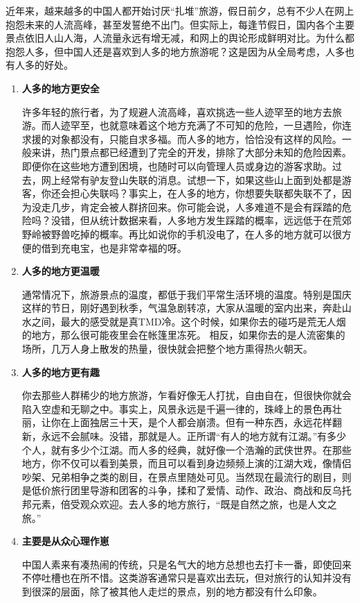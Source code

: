 近年来，越来越多的中国人都开始讨厌“扎堆”旅游，假日前夕，总有不少人在网上抱怨未来的人流高峰，甚至发誓绝不出门。但实际上，每逢节假日，国内各个主要景点依旧人山人海，人流量永远有增无减，和网上的舆论形成鲜明对比。为什么都抱怨人多，但中国人还是喜欢到人多的地方旅游呢？这是因为从全局考虑，人多也有人多的好处。
\begin{enumerate}
    
\item \textbf{人多的地方更安全}

许多年轻的旅行者，为了规避人流高峰，喜欢挑选一些人迹罕至的地方去旅游。而人迹罕至，也就意味着这个地方充满了不可知的危险，一旦遇险，你连求援的对象都没有，只能自求多福。而人多的地方，恰恰没有这样的风险。一般来讲，热门景点都已经遭到了完全的开发，排除了大部分未知的危险因素。即便你在这些地方遭到困境，也随时可以向管理人员或身边的游客求助。过去，网上经常有驴友登山失联的消息。试想一下，如果这些山上面到处都是游客，你还会担心失联吗？事实上，在人多的地方，你想要失联都失联不了，因为没走几步，肯定会被人群挤回来。你可能会说，人多难道不是会有踩踏的危险吗？没错，但从统计数据来看，人多地方发生踩踏的概率，远远低于在荒郊野岭被野兽吃掉的概率。再比如说你的手机没电了，在人多的地方就可以很方便的借到充电宝，也是非常幸福的呀。

\item \textbf{人多的地方更温暖}

通常情况下，旅游景点的温度，都低于我们平常生活环境的温度。特别是国庆这样的节日，刚好遇到秋季，气温急剧转凉，大家从温暖的室内出来，奔赴山水之间，最大的感受就是真TMD冷。这个时候，如果你去的碰巧是荒无人烟的地方，那么很可能夜里会在帐篷里冻死。 相反，如果你去的是人流密集的场所，几万人身上散发的热量，很快就会把整个地方熏得热火朝天。

\item \textbf{人多的地方更有趣}

你去那些人群稀少的地方旅游，乍看好像无人打扰，自由自在，但很快你就会陷入空虚和无聊之中。事实上，风景永远是千遍一律的，珠峰上的景色再壮丽，让你在上面独居三十天，是个人都会崩溃。但有一种东西，永远花样翻新，永远不会腻味。没错，那就是人。正所谓“有人的地方就有江湖。”有多少个人，就有多少个江湖。而人多的经典，就好像一个浩瀚的武侠世界。在那些地方，你不仅可以看到美景，而且可以看到身边频频上演的江湖大戏，像情侣吵架、兄弟相争之类的剧目，在景点里随处可见。当然现在最流行的剧目，则是低价旅行团里导游和团客的斗争，揉和了爱情、动作、政治、商战和反乌托邦元素，倍受观众欢迎。去人多的地方旅行，“既是自然之旅，也是人文之旅。”
\item \textbf{主要是从众心理作崽}

中国人素来有凑热闹的传统，只是名气大的地方总想也去打卡一番，即使回来不停吐槽也在所不惜。这类游客通常只是喜欢出去玩，但对旅行的认知并没有到很深的层面，除了被其他人走烂的景点，别的地方都没有什么印象。
\end{enumerate}
